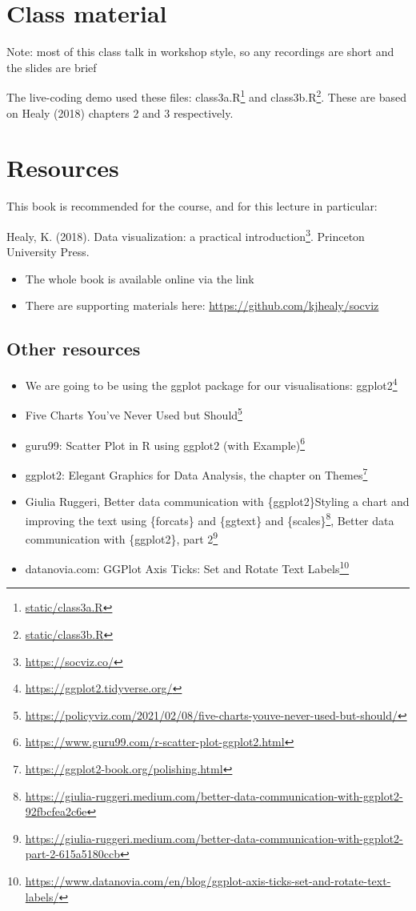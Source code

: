 \documentclass[
  12pt,
  a5paper,
]{book}
\DeclareRobustCommand{\href}[2]{#2\footnote{\url{#1}}}
\providecommand{\tightlist}{%
  \setlength{\itemsep}{0pt}\setlength{\parskip}{0pt}}
\begin{document}
\hypertarget{class-material-1}{%
\section{Class material}\label{class-material-1}}

Note: most of this class talk in workshop style, so any recordings are short and the slides are brief

The live-coding demo used these files: \href{static/class3a.R}{class3a.R} and \href{static/class3b.R}{class3b.R}. These are based on Healy (2018) chapters 2 and 3 respectively.

\hypertarget{resources-2}{%
\section{Resources}\label{resources-2}}

This book is recommended for the course, and for this lecture in particular:

Healy, K. (2018). \href{https://socviz.co/}{Data visualization: a practical introduction}. Princeton University Press.

\begin{itemize}
\tightlist
\item
  The whole book is available online via the link\\
\item
  There are supporting materials here: \url{https://github.com/kjhealy/socviz}
\end{itemize}

\hypertarget{other-resources}{%
\subsection{Other resources}\label{other-resources}}

\begin{itemize}
\tightlist
\item
  We are going to be using the ggplot package for our visualisations: \href{https://ggplot2.tidyverse.org/}{ggplot2}
\item
  \href{https://policyviz.com/2021/02/08/five-charts-youve-never-used-but-should/}{Five Charts You've Never Used but Should}
\item
  guru99: \href{https://www.guru99.com/r-scatter-plot-ggplot2.html}{Scatter Plot in R using ggplot2 (with Example)}
\item
  ggplot2: Elegant Graphics for Data Analysis, the chapter on \href{https://ggplot2-book.org/polishing.html}{Themes}
\item
  Giulia Ruggeri, Better data communication with \{ggplot2\}\href{https://giulia-ruggeri.medium.com/better-data-communication-with-ggplot2-92fbcfea2c6e}{Styling a chart and improving the text using \{forcats\} and \{ggtext\} and \{scales\}}, \href{https://giulia-ruggeri.medium.com/better-data-communication-with-ggplot2-part-2-615a5180ccb}{Better data communication with \{ggplot2\}, part 2}
\item
  datanovia.com: \href{https://www.datanovia.com/en/blog/ggplot-axis-ticks-set-and-rotate-text-labels/}{GGPlot Axis Ticks: Set and Rotate Text Labels}
\end{itemize}
\end{document}
